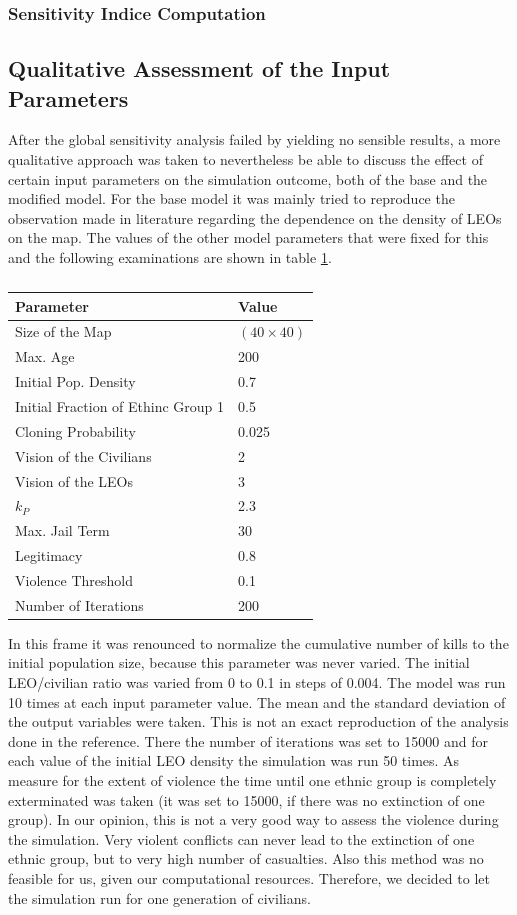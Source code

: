\documentclass[11pt]{article}
\begin{document}
\subsubsection{Sensitivity Indice Computation}

\subsection{Qualitative Assessment of the Input Parameters}
After the global sensitivity analysis failed by yielding no sensible results, a more qualitative approach was taken to nevertheless be able to discuss the effect of certain input parameters on the simulation outcome, both of the base and the modified model. For the base model it was mainly tried to reproduce the observation made in literature regarding the dependence on the density of LEOs on the map. The values of the other model parameters that were fixed for this and the following examinations are shown in table \ref{tab:values_parameters}.
\begin{table}[!htbp]
	\centering
	\caption{}
	\vspace{0.5 cm}
		\begin{tabular}{l | l}
		Parameter & Value\\
		\hline
		Size of the Map & $(40 \times 40)$\\
		Max. Age & 200\\
		Initial Pop. Density & 0.7\\
		Initial Fraction of Ethinc Group 1 & 0.5\\
		Cloning Probability & 0.025\\
		Vision of the Civilians & 2\\
		Vision of the LEOs & 3\\
		$k_P$ & 2.3\\
		Max. Jail Term & 30\\
		Legitimacy & 0.8\\
		Violence Threshold & 0.1\\
		Number of Iterations & 200\\
	\end{tabular}
	\label{tab:values_parameters}
\end{table}
In this frame it was renounced to normalize the cumulative number of kills to the initial population size, because this parameter was never varied. The initial LEO/civilian ratio was varied from 0 to 0.1 in steps of 0.004. The model was run 10 times at each input parameter value. The mean and the standard deviation of the output variables were taken. This is not an exact reproduction of the analysis done in the reference. There the number of iterations was set to 15000 and for each value of the initial LEO density the simulation was run 50 times. As measure for the extent of violence the time until one ethnic group is completely exterminated was taken (it was set to 15000, if there was no extinction of one group). In our opinion, this is not a very good way to assess the violence during the simulation. Very violent conflicts can never lead to the extinction of one ethnic group, but to very high number of casualties. Also this method was no feasible for us, given our computational resources. Therefore, we decided to let the simulation run for one generation of civilians.\\
\end{document}
